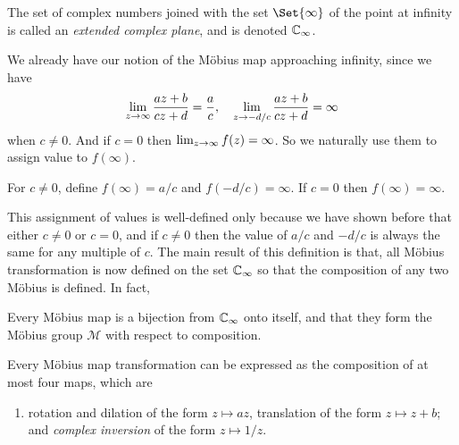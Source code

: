 \documentclass[main.tex]{subfiles}
\begin{document}
		\begin{definition}
			The set of complex numbers joined with the set $\Set{\infty}$ of the point at infinity is called an \textit{extended complex plane}, and is denoted $\mathbb C_\infty$.
		\end{definition}
		We already have our notion of the M\"obius map approaching infinity,  since we have
		\begin{equation*}
			\lim_{z \rightarrow \infty}\frac{az + b}{cz + d} = \frac{a}{c}, \quad \lim_{z \rightarrow {-d}/{c}} \frac{az + b}{cz + d} = \infty
		\end{equation*}
		when $c \neq 0$. And if $c = 0$ then $\lim_{z \rightarrow \infty} f(z) = \infty$. So we naturally use them to assign value to $f(\infty)$.
		\begin{definition}
			For $c \neq 0$, define $f(\infty) = a/c$ and $f(-d/c) = \infty$. If $c = 0$ then $f(\infty) = \infty$.
		\end{definition}
		This assignment of values is well-defined only because we have shown before that either $c\neq 0$ or $c = 0$, and if $c \neq 0$ then the value of $a/c$ and $-d/c$ is always the same for any multiple of $c$. The main result of this definition is that, all M\"obius transformation is now defined on the set $\mathbb C_\infty$ so that the composition of any two M\"obius is defined. In fact,
		\begin{theorem}
			Every M\"obius map is a bijection from $\mathbb C_\infty$ onto itself, and that they form the M\"obius group $\mathcal{M}$ with respect to composition.
		\end{theorem}
		\begin{theorem}
			Every M\"obius map transformation can be expressed as the composition of at most four maps, which are
			\begin{enumerate}
				\item rotation and dilation of the form $z \mapsto az$,
				\ii  translation of the form $z \mapsto z + b$; and
				\ii \textit{complex inversion} of the form $z \mapsto 1/z$.
			\end{enumerate}
		\end{theorem}
		
\end{document}
